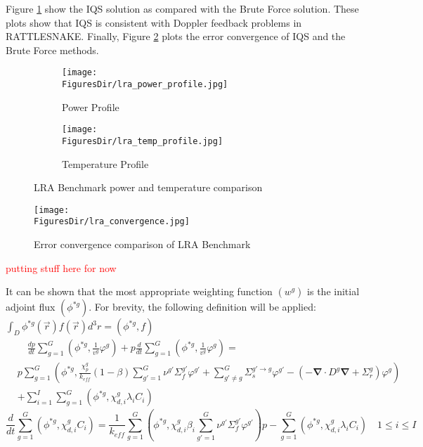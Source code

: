 \documentclass[12pt]{scrartcl}
\renewcommand{\div}{\bs{\nabla}\! \cdot \!}
\newcommand{\grad}{\bs{\nabla}}
\newcommand{\bs}[1]{\mathbf{#1}}
\newcommand{\keff}{k_\textit{eff}}
\newcommand{\be}{\begin{equation}}
\newcommand{\ee}{\end{equation}}
\newcommand{\tcr}[1]{\textcolor{red}{#1}}
\newcommand{\FiguresDir}{./figs}
\begin{document}
Figure \ref{fig:LRA_plots} show the IQS  solution as compared with the Brute Force solution.    These plots show that IQS is consistent with Doppler feedback problems in RATTLESNAKE.  Finally, Figure \ref{fig:lra_conv} plots the error convergence of IQS and the Brute Force methods.  

\begin{figure}[!htbp]
\begin{center}
\begin{subfigure}[!htbp]{0.49\textwidth}
\texttt{[image: \\FiguresDir/lra\_power\_profile.jpg]}
\caption{Power Profile}
\end{subfigure}
\begin{subfigure}[!htbp]{0.49\textwidth}
\texttt{[image: \\FiguresDir/lra\_temp\_profile.jpg]}
\caption{Temperature Profile}
\end{subfigure}
\caption{LRA Benchmark power and temperature comparison}
\label{fig:LRA_plots}
\end{center}
\end{figure}

\begin{figure}[!htbp]
\centering
\texttt{[image: \\FiguresDir/lra\_convergence.jpg]}
\caption{Error convergence comparison of LRA Benchmark}
\label{fig:lra_conv}
\end{figure}



\appendix


\tcr{putting stuff here for now}

It can be shown that the most appropriate weighting function $(w^g)$ is the initial adjoint flux $(\phi^{*g})$.  For brevity, the following definition will be applied: $\int_D\phi^{*g}(\vec{r})f(\vec{r})d^3r=\left(\phi^{*g},f\right)$
\begin{align}
& \quad \frac{dp}{dt}\sum_{g=1}^G\left(\phi^{*g},\frac{1}{v^g}\varphi^g\right)+ p\frac{d}{dt}\sum_{g=1}^G\left(\phi^{*g},\frac{1}{v^g}\varphi^g\right)= \nonumber \\
& p\sum_{g=1}^G\left(\phi^{*g},\frac{\chi_p^g}{\keff}(1-\beta) \sum_{g'=1}^G  \nu^{g'} \Sigma_f^{g'} \varphi^{g'} + \sum_{g'\neq g}^G\Sigma_s^{g'\to g} \varphi^{g'} - \left( -\div D^g \grad  + \Sigma_r^g \right) \varphi^g\right)  \\
& + \sum_{i=1}^I\sum_{g=1}^G(\phi^{*g},\chi_{d,i}^g\lambda_i C_i) \nonumber
\end{align}
\be
\frac{d}{dt}\sum_{g=1}^G(\phi^{*g},\chi_{d,i}^gC_i)=\frac{1}{\keff}\sum_{g=1}^G(\phi^{*g},\chi_{d,i}^g\beta_i\sum_{g'=1}^G\nu^{g'} \Sigma_f^{g' }\varphi^{g'})p - \sum_{g=1}^G(\phi^{*g},\chi_{d,i}^g\lambda_iC_i) \quad 1 \le i \le I 
\ee
\end{document}
